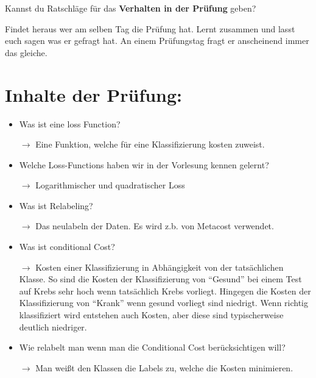 \documentclass[a4paper]{article}
\begin{document}
\begin{multicols}{2}
\begin{minipage}[t][7cm]{\linewidth}
  \end{minipage}

   Kannst du Ratschläge für das \textbf{Verhalten in der Prüfung} geben? \\
  \begin{minipage}[t][6.8cm]{\linewidth}
    Findet heraus wer am selben Tag die Prüfung hat. Lernt zusammen und lasst
    euch sagen was er gefragt hat. An einem Prüfungstag fragt er anscheinend
    immer das gleiche.
  \end{minipage}
%
\end{multicols}
\clearpage

\section*{Inhalte der Prüfung:}

    \begin{itemize}
        \item Was ist eine loss Function?
        \item[$\rightarrow$] Eine Funktion, welche für eine Klassifizierung
                             kosten zuweist.
        \item Welche Loss-Functions haben wir in der Vorlesung kennen gelernt?
        \item[$\rightarrow$] Logarithmischer und quadratischer Loss
        \item Was ist Relabeling?
        \item[$\rightarrow$] Das neulabeln der Daten. Es wird z.b. von Metacost
                             verwendet.
        \item Was ist conditional Cost?
        \item[$\rightarrow$] Kosten einer Klassifizierung in Abhängigkeit von
                             der tatsächlichen Klasse. So sind die Kosten der
                             Klassifizierung von \enquote{Gesund} bei einem
                             Test auf Krebs sehr hoch wenn tatsächlich Krebs
                             vorliegt. Hingegen die Kosten der Klassifizierung
                             von \enquote{Krank} wenn gesund vorliegt sind
                             niedrigt. Wenn richtig klassifiziert wird
                             entstehen auch Kosten, aber diese sind
                             typischerweise deutlich niedriger.
        \item Wie relabelt man wenn man die Conditional Cost berücksichtigen
              will?
        \item[$\rightarrow$] Man weißt den Klassen die Labels zu, welche die
                             Kosten minimieren.
    \end{itemize}
\end{document}
